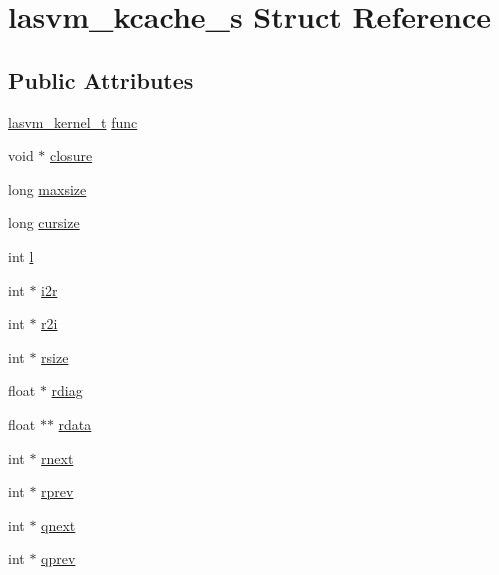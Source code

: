 \hypertarget{structlasvm__kcache__s}{\section{lasvm\+\_\+kcache\+\_\+s Struct Reference}
\label{structlasvm__kcache__s}
}
\subsection*{Public Attributes}
\begin{DoxyCompactItemize}
\item 
\hyperlink{kernel_8h_a570ca1df9adadb603aebfb31e9948b88}{lasvm\+\_\+kernel\+\_\+t} \hyperlink{structlasvm__kcache__s_a7e5e8547ce3165e68060e3ce0d150436}{func}
\item 
void $\ast$ \hyperlink{structlasvm__kcache__s_a4516c91ba6dd7799504249943ff9cbf8}{closure}
\item 
long \hyperlink{structlasvm__kcache__s_a81fcd8ad85ea860948baf7ac23d6ecc4}{maxsize}
\item 
long \hyperlink{structlasvm__kcache__s_a84940d998a6b827f729a6fafa8ae59b1}{cursize}
\item 
int \hyperlink{structlasvm__kcache__s_a4bf7b51eda770a56e9a5b1d263582d20}{l}
\item 
int $\ast$ \hyperlink{structlasvm__kcache__s_af4e1cdc8a78c26af9cf0f2db0b2c6ac0}{i2r}
\item 
int $\ast$ \hyperlink{structlasvm__kcache__s_a418ae3b721bff88c50b97b228692af5f}{r2i}
\item 
int $\ast$ \hyperlink{structlasvm__kcache__s_a9bac344d9cc738084353c1a82c18e60d}{rsize}
\item 
float $\ast$ \hyperlink{structlasvm__kcache__s_aeb1c9c0751894c370f9db656010897a2}{rdiag}
\item 
float $\ast$$\ast$ \hyperlink{structlasvm__kcache__s_a5761e47947e35dc653251561720b5750}{rdata}
\item 
int $\ast$ \hyperlink{structlasvm__kcache__s_aa309c64f6bbab6f27100533b7004b5da}{rnext}
\item 
int $\ast$ \hyperlink{structlasvm__kcache__s_a10711142a92275d73e7af447058176e6}{rprev}
\item 
int $\ast$ \hyperlink{structlasvm__kcache__s_a27aba77f95b1e21947d604873f47da7c}{qnext}
\item 
int $\ast$ \hyperlink{structlasvm__kcache__s_ad2e2c40c12136594c16579484fa8a08c}{qprev}
\end{DoxyCompactItemize}


